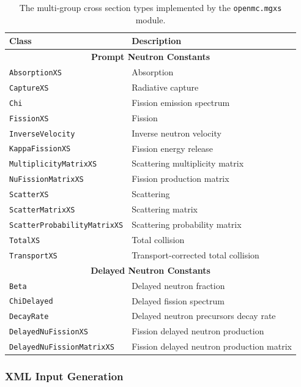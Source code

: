 \begin{table}[h!]
  \centering
  \caption{The multi-group cross section types implemented by the \texttt{openmc.mgxs} module.}
  \small
  \label{tab:mgxs-types}
  \vspace{6pt}
  \begin{tabular}{l l}
  \toprule
  \textbf{Class} &
  \textbf{Description} \\
  \midrule
  \multicolumn{2}{c}{\bf Prompt Neutron Constants} \\
  \midrule
  \texttt{AbsorptionXS} & Absorption \\
  \texttt{CaptureXS} & Radiative capture \\
  \texttt{Chi} & Fission emission spectrum \\
  \texttt{FissionXS} & Fission \\
  \texttt{InverseVelocity} & Inverse neutron velocity \\
  \texttt{KappaFissionXS} & Fission energy release \\
  \texttt{MultiplicityMatrixXS} & Scattering multiplicity matrix \\
  \texttt{NuFissionMatrixXS} & Fission production matrix \\
  \texttt{ScatterXS} & Scattering \\
  \texttt{ScatterMatrixXS} & Scattering matrix \\
  \texttt{ScatterProbabilityMatrixXS} & Scattering probability matrix \\
  \texttt{TotalXS} & Total collision \\
  \texttt{TransportXS} & Transport-corrected total collision \\
  \midrule
  \multicolumn{2}{c}{\bf Delayed Neutron Constants} \\
  \midrule
  \texttt{Beta} & Delayed neutron fraction \\
  \texttt{ChiDelayed} & Delayed fission spectrum \\
  \texttt{DecayRate} & Delayed neutron precursors decay rate \\
  \texttt{DelayedNuFissionXS} & Fission delayed neutron production \\
  \texttt{DelayedNuFissionMatrixXS} & Fission delayed neutron production matrix \\
  \bottomrule
\end{tabular}
\end{table}


\subsubsection{XML Input Generation}
\label{subsec:xml-inputs}

